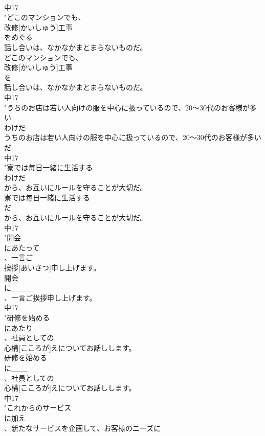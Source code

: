 \documentclass[8pt]{extreport}
\begin{document}
\begin{CJK}{UTF8}{min}
\\	中17
\\	"どこのマンションでも、
\\	改修[かいしゅう]工事
\\	をめぐる
\\	話し合いは、なかなかまとまらないものだ。
\\	どこのマンションでも、
\\	改修[かいしゅう]工事
\\	を___
\\	話し合いは、なかなかまとまらないものだ。
\\	中17
\\	"うちのお店は若い人向けの服を中心に扱っているので、20～30代のお客様が多い
\\	わけだ
\\	うちのお店は若い人向けの服を中心に扱っているので、20～30代のお客様が多い
\\	だ
\\	中17
\\	"寮では毎日一緒に生活する
\\	わけだ
\\	から、お互いにルールを守ることが大切だ。
\\	寮では毎日一緒に生活する
\\	だ
\\	から、お互いにルールを守ることが大切だ。
\\	中17
\\	"開会
\\	にあたって
\\	、一言ご
\\	挨拶[あいさつ]申し上げます。
\\	開会
\\	に____
\\	、一言ご挨拶申し上げます。
\\	中17
\\	"研修を始める
\\	にあたり
\\	、社員としての
\\	心構[こころが]えについてお話しします。
\\	研修を始める
\\	に___
\\	、社員としての
\\	心構[こころが]えについてお話しします。
\\	中17
\\	"これからのサービス
\\	に加え
\\	、新たなサービスを企画して、お客様のニーズに

\end{CJK}
\end{document}
